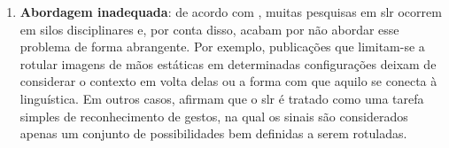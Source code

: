 \begin{enumerate}
      \item \textbf{Abordagem inadequada}:
            de acordo com , muitas pesquisas em \acrshort{slr} ocorrem em silos disciplinares e, por conta disso, acabam por não abordar esse problema de forma abrangente.
            Por exemplo, publicações que limitam-se a rotular imagens de mãos estáticas em determinadas configurações deixam de considerar o contexto em volta delas ou a forma com que aquilo se conecta à linguística.
            Em outros casos,  afirmam que o \acrshort{slr} é tratado como uma tarefa simples de reconhecimento de gestos, na qual os sinais são considerados apenas um conjunto de possibilidades bem definidas a serem rotuladas.






\end{enumerate}
